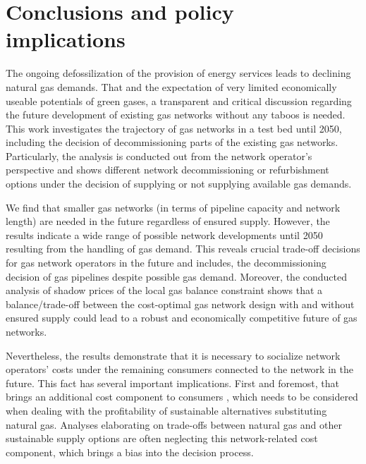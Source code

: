 \section{Conclusions and policy implications}\label{conclusions}
The ongoing defossilization of the provision of energy services leads to declining natural gas demands. That and the expectation of very limited economically useable potentials of green gases, a transparent and critical discussion regarding the future development of existing gas networks without any taboos is needed. This work investigates the trajectory of gas networks in a test bed until 2050, including the decision of decommissioning parts of the existing gas networks. Particularly, the analysis is conducted out from the network operator's perspective and shows different network decommissioning or refurbishment options under the decision of supplying or not supplying available gas demands.\vspace{0.3cm}

We find that smaller gas networks (in terms of pipeline capacity and network length) are needed in the future regardless of ensured supply. However, the results indicate a wide range of possible network developments until 2050 resulting from the handling of gas demand. This reveals crucial trade-off decisions for gas network operators in the future and includes, the decommissioning decision of gas pipelines despite possible gas demand. Moreover, the conducted analysis of shadow prices of the local gas balance constraint shows that a balance/trade-off between the cost-optimal gas network design with and without ensured supply could lead to a robust and economically competitive future of gas networks.\vspace{0.3cm}

Nevertheless, the results demonstrate that it is necessary to socialize network operators' costs under the remaining consumers connected to the network in the future. This fact has several important implications. First and foremost, that brings an additional cost component to consumers , which needs to be considered when dealing with the profitability of sustainable alternatives substituting natural gas. Analyses elaborating on trade-offs between natural gas and other sustainable supply options are often neglecting this network-related cost component, which brings a bias into the decision process.\vspace{0.3cm}

